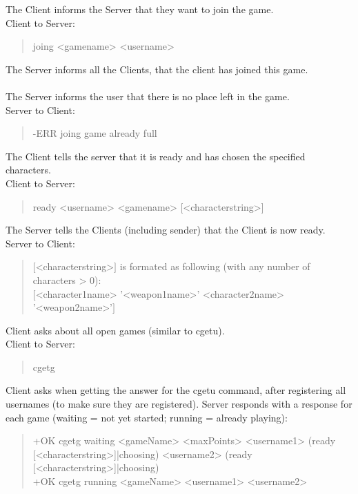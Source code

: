 \documentclass[a4paper,11pt]{article}
\begin{document}
\noindent
The Client informs the Server that they want to join the game.\\
Client to Server:
\begin{quote}
  joing <gamename> <username>
\end{quote}

\noindent
The Server informs all the Clients, that the client has joined this game.\\\\

The Server informs the user that there is no place left in the game.\\
Server to Client:
\begin{quote}
  -ERR joing game already full
\end{quote}

\noindent
The Client tells the server that it is ready and has chosen the specified characters.\\
Client to Server:
\begin{quote}
  ready <username> <gamename> [<characterstring>]
\end{quote}

\noindent
The Server tells the Clients (including sender) that the Client is now ready.
Server to Client:
\begin{quote}
  $[$<characterstring>$]$  is formated as following (with any number of characters > 0):\\
	$[$<character1name> '<weapon1name>' <character2name> '<weapon2name>'$]$ 
\end{quote}	

\noindent
Client asks about all open games (similar to cgetu).\\
Client to Server:
\begin{quote}
  cgetg
\end{quote}

\noindent	
Client asks when getting the answer for the cgetu command, after registering all usernames (to make sure they are registered).
Server responds with a response for each game (waiting = not yet started; running = already playing):
\begin{quote}
  +OK cgetg waiting <gameName> <maxPoints> <username1> (ready [<characterstring>]|choosing) <username2> (ready [<characterstring>]|choosing)\\
  +OK cgetg running <gameName> <username1> <username2>
\end{quote}
\end{document}
